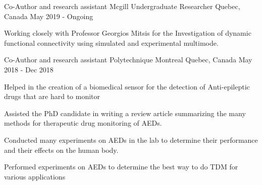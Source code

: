 \begin{cventries}
  \cventry
    {Co-Author and research assistant}
    {Mcgill Undergraduate Researcher}
    {Quebec, Canada}
    {May 2019 - Ongoing}
    {
      \begin{cvitems}
        \item {Working closely with Professor Georgios Mitsis for the Investigation of dynamic functional connectivity using simulated and experimental multimode.}
      \end{cvitems}
    }
\end{cventries}
\begin{cventries}
  \cventry
    {Co-Author and research assistant}
    {Polytechnique Montreal}
    {Quebec, Canada}
    {May 2018 - Dec 2018}
    {
      \begin{cvitems}
        \item {Helped in the creation of a biomedical sensor for the detection of Anti-epileptic drugs that are hard to monitor}
        \item {Assisted the PhD candidate in writing a review article summarizing the many methods for therapeutic drug monitoring of AEDs.}
        \item {Conducted many experiments on AEDs in the lab to determine their performance and their effects on the human body.}
        \item {Performed experiments on AEDs to determine the best way to do TDM for various applications}
      \end{cvitems}
    }
\end{cventries}